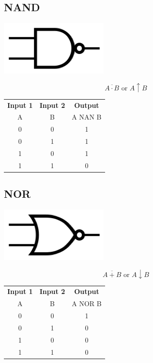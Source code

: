 \documentclass[11pt]{book}
\begin{document}
\subsection{NAND}
\begin{center}
	\includegraphics{figures/20.04.png}
\end{center}
\begin{equation}
	\overline{A\cdot B} \text{ or } A \uparrow B
\end{equation}
\begin{center}
	\begin{tabular}{c c c}
		\textbf{Input 1} &  \textbf{Input 2} & \textbf{Output} \\
		A & B & A NAN B \\
		0 & 0 & 1 \\
		0 & 1 & 1 \\
		1 & 0 & 1 \\
		1 & 1 & 0
	\end{tabular}
\end{center}

\newpage

\subsection{NOR}
\begin{center}
	\includegraphics{figures/20.05.png}
\end{center}
\begin{equation}
	\overline{A+B} \text{ or } A \downarrow B
\end{equation}
\begin{center}
	\begin{tabular}{c c c}
		\textbf{Input 1} &  \textbf{Input 2} & \textbf{Output} \\
		A & B & A NOR B \\
		0 & 0 & 1 \\
		0 & 1 & 0 \\
		1 & 0 & 0 \\
		1 & 1 & 0
	\end{tabular}
\end{center}
\end{document}
